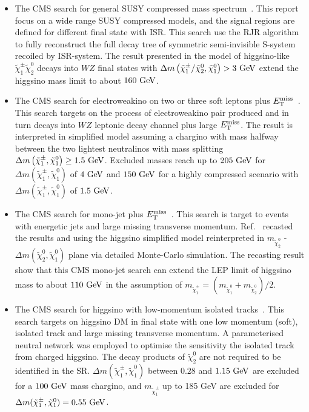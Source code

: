 \documentclass[letterpaper,11pt]{article}
\begin{document}
\begin{itemize}
	\item The CMS search for general SUSY compressed mass spectrum~\cite{CMS-PAS-SUS-23-003}. This report focus on a wide range SUSY compressed models, and the signal regions are defined for different final state with ISR. This search use the RJR algorithm to fully reconstruct the full decay tree of symmetric semi-invisible S-system recoiled by ISR-system. The result presented in the model of higgsino-like $\tilde{\chi}_1^\pm \tilde{\chi}_2^0$ decays into $WZ$ final states with $\Delta m \left( \tilde{\chi}_1^\pm/\tilde{\chi}_2^0, \tilde{\chi}_1^0 \right) > 3~{\rm GeV}$ extend the higgsino mass limit to about $160~{\rm GeV}$. 
	\item The CMS search for electroweakino on two or three soft leptons plus $E_{\rm T}^{\rm miss}$~\cite{CMS:2021edw}. This search targets on the process of electroweakino pair produced and in turn decays into $WZ$ leptonic decay channel plus large $E_{\rm T}^{\rm miss}$. The result is interpreted in simplified model assuming a chargino with mass halfway between the two lightest neutralinos with mass splitting $\Delta m \left( \tilde{\chi}_1^\pm, \tilde{\chi}_1^0 \right) \geq  1.5~{\rm GeV}$. Excluded masses reach up to $205~{\rm GeV}$ for $\Delta m \left( \tilde{\chi}_1^\pm, \tilde{\chi}_1^0 \right)$ of $4~{\rm GeV}$ and $150~{\rm GeV}$ for a highly compressed scenario with $\Delta m \left( \tilde{\chi}_1^\pm, \tilde{\chi}_1^0 \right)$ of $1.5~{\rm GeV}$. 
	\item The CMS search for mono-jet plus $E_{\rm T}^{\rm miss}$~\cite{CMS:2021far}. This search is target to events with energetic jets and large missing transverse momentum. Ref.~\cite{Agin:2023yoq} recasted the results and using the higgsino simplified model reinterpreted in $m_{\tilde{\chi}_2^0}$ - $\Delta m(\tilde{\chi}_2^0, \tilde{\chi}_1^0)$ plane via detailed Monte-Carlo simulation. The recasting result show that this CMS mono-jet search can extend the LEP limit of higgsino mass to about $110~{\rm GeV}$ in the assumption of $m_{\tilde{\chi}_1^\pm} = \left( m_{\tilde{\chi}_1^0} + m_{\tilde{\chi}_2^0} \right) \big/2$. 
    \item The CMS search for higgsino with low-momentum isolated tracks~\cite{CMS:2025twk}. This search targets on higgsino DM in final state with one low momentum (soft), isolated track and large missing transverse momentum. A parameterised neutral network was employed to optimise the sensitivity the isolated track from charged higgsino. The decay products of $\tilde{\chi}_2^0$ are not required to be identified in the SR. $\Delta m(\tilde{\chi}_1^\pm, \tilde{\chi}_1^0)$ between $0.28$ and $1.15~{\rm GeV}$ are excluded for a $100~{\rm GeV}$ mass chargino, and $m_{\tilde{\chi}_1^\pm}$ up to 185 GeV are excluded for $\Delta m(\tilde{\chi}_1^\pm, \tilde{\chi}_1^0) = 0.55~{\rm GeV}$. 

\end{itemize}
\end{document}
